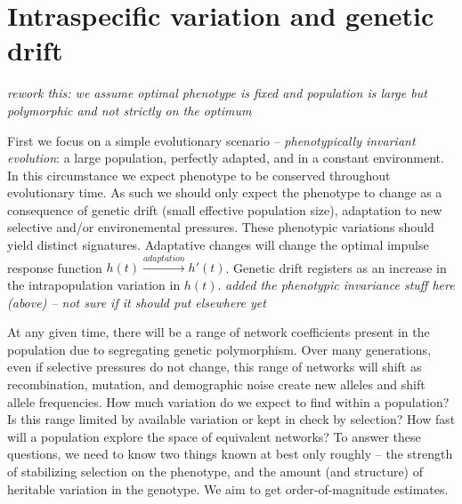 \documentclass{article}
\newcommand{\plr}[1]{{\color{blue}\it #1}}
\newcommand{\jss}[1]{{\color{olive}\it #1}}
\newcommand{\1}{\mathbbm{1}}
\begin{document}
  \section*{Intraspecific variation and genetic drift}

  \plr{rework this: we assume optimal phenotype is fixed and population is large but polymorphic and not strictly on the optimum}

First we focus on a simple evolutionary scenario -- \emph{phenotypically invariant evolution}: a large population, perfectly adapted, and in a constant environment. In this circumstance we expect phenotype to be conserved throughout evolutionary time. As such we should only expect the phenotype to change as a consequence of genetic drift (small effective population size), adaptation to new selective and/or environemental pressures. These phenotypic variations should yield distinct signatures. Adaptative changes will change the optimal impulse response function $h(t) \xrightarrow{adaptation} h'(t)$. Genetic drift registers as an increase in the intrapopulation variation in $h(t)$. 
 \jss{added the phenotypic invariance stuff here (above) -- not sure if it should put elsewhere yet}

  At any given time, there will be a range of network coefficients present in the population
  due to segregating genetic polymorphism.
  Over many generations, even if selective pressures do not change,
  this range of networks will shift 
  as recombination, mutation, and demographic noise create new alleles and shift allele frequencies.
  How much variation do we expect to find within a population?
  Is this range limited by available variation or kept in check by selection?
  How fast will a population explore the space of equivalent networks?
  To answer these questions, we need to know two things known at best only roughly \citep{felsenstein1988phylogenies} --
  the strength of stabilizing selection on the phenotype,
  and the amount (and structure) of heritable variation in the genotype.
  We aim to get order-of-magnitude estimates.
\end{document}

